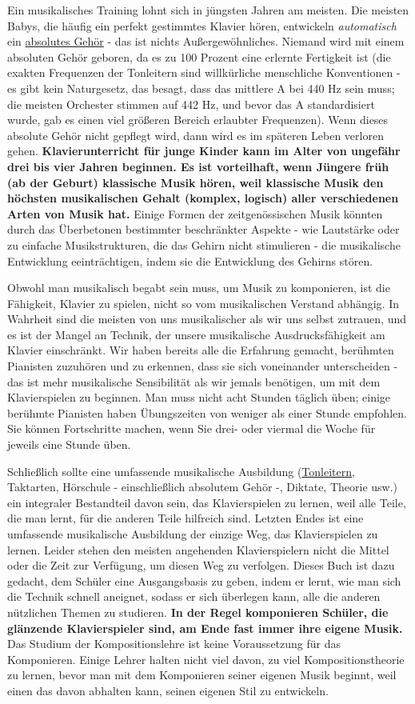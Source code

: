 Ein musikalisches Training lohnt sich in jüngsten Jahren am meisten.
Die meisten Babys, die häufig ein perfekt gestimmtes Klavier hören, entwickeln \textit{automatisch} ein \hyperlink{c1iii12}{absolutes Gehör} - das ist nichts Außergewöhnliches.
Niemand wird mit einem absoluten Gehör geboren, da es zu 100 Prozent eine erlernte Fertigkeit ist (die exakten Frequenzen der Tonleitern sind willkürliche menschliche Konventionen - es gibt kein Naturgesetz, das besagt, dass das mittlere A bei 440 Hz sein muss; die meisten Orchester stimmen auf 442 Hz, und bevor das A standardisiert wurde, gab es einen viel größeren Bereich erlaubter Frequenzen).
Wenn dieses absolute Gehör nicht gepflegt wird, dann wird es im späteren Leben verloren gehen.
\textbf{Klavierunterricht für junge Kinder kann im Alter von ungefähr drei bis vier Jahren beginnen.
Es ist vorteilhaft, wenn Jüngere früh (ab der Geburt) klassische Musik hören, weil klassische Musik den höchsten musikalischen Gehalt (komplex, logisch) aller verschiedenen Arten von Musik hat.}
Einige Formen der zeitgenössischen Musik könnten durch das Überbetonen bestimmter beschränkter Aspekte - wie Lautstärke oder zu einfache Musikstrukturen, die das Gehirn nicht stimulieren - die musikalische Entwicklung eeinträchtigen, indem sie die Entwicklung des Gehirns stören.

Obwohl man musikalisch begabt sein muss, um Musik zu komponieren, ist die Fähigkeit, Klavier zu spielen, nicht so vom musikalischen Verstand abhängig.
In Wahrheit sind die meisten von uns musikalischer als wir uns selbst zutrauen, und es ist der Mangel an Technik, der unsere musikalische Ausdrucksfähigkeit am Klavier einschränkt.
Wir haben bereits alle die Erfahrung gemacht, berühmten Pianisten zuzuhören und zu erkennen, dass sie sich voneinander unterscheiden - das ist mehr musikalische Sensibilität als wir jemals benötigen, um mit dem Klavierspielen zu beginnen.
Man muss nicht acht Stunden täglich üben; einige berühmte Pianisten haben Übungszeiten von weniger als einer Stunde empfohlen.
Sie können Fortschritte machen, wenn Sie drei- oder viermal die Woche für jeweils eine Stunde üben.

Schließlich sollte eine umfassende musikalische Ausbildung (\hyperlink{c1iii5a}{Tonleitern}, Taktarten, Hörschule - einschließlich absolutem Gehör -, Diktate, Theorie usw.) ein integraler Bestandteil davon sein, das Klavierspielen zu lernen, weil alle Teile, die man lernt, für die anderen Teile hilfreich sind.
Letzten Endes ist eine umfassende musikalische Ausbildung der einzige Weg, das Klavierspielen zu lernen.
Leider stehen den meisten angehenden Klavierspielern nicht die Mittel oder die Zeit zur Verfügung, um diesen Weg zu verfolgen.
Dieses Buch ist dazu gedacht, dem Schüler eine Ausgangsbasis zu geben, indem er lernt, wie man sich die Technik schnell aneignet, sodass er sich überlegen kann, alle die anderen nützlichen Themen zu studieren.
\textbf{In der Regel komponieren Schüler, die glänzende Klavierspieler sind, am Ende fast immer ihre eigene Musik.}
Das Studium der Kompositionslehre ist keine Voraussetzung für das Komponieren.
Einige Lehrer halten nicht viel davon, zu viel Kompositionstheorie zu lernen, bevor man mit dem Komponieren seiner eigenen Musik beginnt, weil einen das davon abhalten kann, seinen eigenen Stil zu entwickeln.

